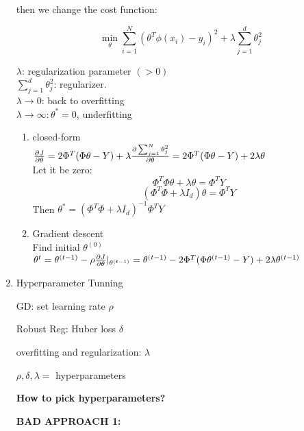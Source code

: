 \documentclass[12pt]{article}
\begin{document}
\begin{enumerate}
            then we change the cost function:

            $$\min_{\theta} \sum_{i = 1}^{N}(\theta^T\phi(x_i) - y_i)^2 + \lambda \sum_{j = 1}^d \theta_j^2$$

            $\lambda$: regularization parameter $(> 0)$\\
            $\sum_{j = 1}^d \theta_j^2$: regularizer.\\      
            $\lambda \rightarrow 0$: back to overfitting \\
            $\lambda \rightarrow \infty: \theta^* = 0$, underfitting
            \begin{enumerate}
                \item closed-form \\
                    $\frac{\partial J}{\partial \theta} \\
                    = 2 \Phi^T(\Phi \theta - Y) + \lambda \frac{\partial \sum_{j = 1}^N \theta_j^2}{\partial \theta} \\
                    = 2\Phi^T(\Phi \theta - Y) + 2\lambda \theta$\\
                    Let it be zero:
                    $$\Phi^T \Phi \theta + \lambda \theta = \Phi^T Y$$
                    $$(\Phi^T \Phi + \lambda I_d )\theta = \Phi^T Y$$
                    Then $\theta^* = (\Phi^T \Phi + \lambda I_d )^{-1}\Phi^T Y$
                \item Gradient descent \\
                    Find initial $\theta^{(0)}$\\
                    $\theta^{t} = \theta^{(t-1)} - \rho \frac{\partial J}{\partial \theta}|_{\theta^{(t-1)}} \\
                    = \theta^{(t-1)} - 2\Phi^T(\Phi \theta^{(t-1)} - Y) + 2\lambda \theta^{(t-1)}$
            \end{enumerate}

            \item Hyperparameter Tunning
            
            GD: set learning rate $\rho$

            Robust Reg: Huber loss $\delta$

            overfitting and regularization: $\lambda$

            $\rho, \delta, \lambda = $ hyperparameters

            \textbf{How to pick hyperparameters?}

            \textbf{BAD APPROACH 1:}


\end{enumerate}
\end{document}
